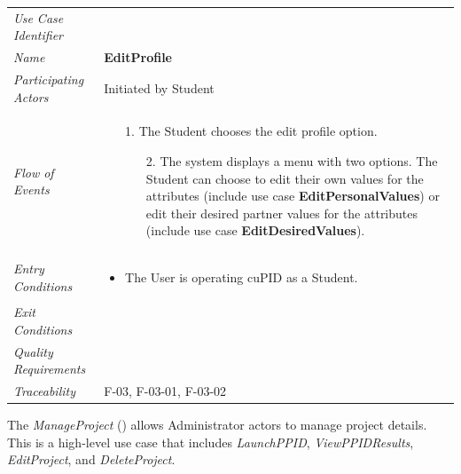 \documentclass[12pt,letterpaper]{article}
\begin{document}
\begin{center}
	\begin{tabu} to 
		\toprule
		Use Case Identifier &  \\
		Name & {\bf EditProfile} \\
		Participating Actors & Initiated by Student \\
		Flow of Events & 
		\begin{minipage}[t]{\linewidth}
		    \begin{enumerate}
		    		\item[1.] The Student chooses the edit profile option.
		    		\begin{enumerate}
			    		\item[2.] The system displays a menu with two options. The Student can choose to edit their own values for the attributes (include use case \textbf{EditPersonalValues}) or edit their desired partner values for the attributes (include use case \textbf{EditDesiredValues}).
		    		\end{enumerate}
			\end{enumerate}
		\end{minipage} \\

		Entry Conditions &
		\begin{minipage}[t]{\linewidth}
			\begin{itemize}
			    \item The User is operating cuPID as a Student.
	        \end{itemize}
		\end{minipage} \\

		Exit Conditions & \\

		Quality Requirements & \\

		Traceability &  F-03, F-03-01, F-03-02 \\
		\toprule
	\end{tabu}
\end{center}

\vspace{1em}
The {\it ManageProject} () allows Administrator actors to manage project details. This is a high-level use case that
includes {\it LaunchPPID}, {\it ViewPPIDResults}, {\it EditProject}, and {\it DeleteProject}.
\end{document}
